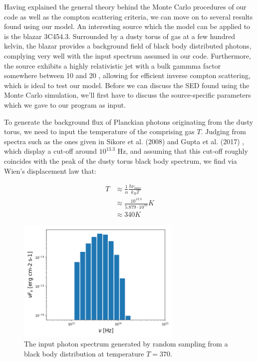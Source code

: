 \documentclass{article}
\begin{document}
    Having explained the general theory behind the Monte Carlo procedures of our code as well as the compton scattering criteria, we can move on to several results found using our model. An interesting source which the model can be applied to is the blazar 3C454.3. Surrounded by a dusty torus of gas at a few hundred kelvin, the blazar provides a background field of black body distributed photons, complying very well with the input spectrum assumed in our code. Furthermore, the source exhibits a highly relativistic jet with a bulk gammma factor somewhere between 10 and 20 \cite{Hovatta2009,Gupta2017}, allowing for efficient inverse compton scattering, which is ideal to test our model. Before we can discuss the SED found using the Monte Carlo simulation, we'll first have to discuss the source-specific parameters which we gave to our program as input. \\

    \par To generate the background flux of Planckian photons originating from the dusty torus, we need to input the temperature of the comprising gas $T$. Judging from spectra such as the ones given in Sikore et al. (2008) \cite{Sikora2008} and Gupta et al. (2017) \cite{Gupta2017}, which display a cut-off around $10^{13.3}$ Hz, and assuming that this cut-off roughly coincides with the peak of the dusty torus black body spectrum, we find via Wien's displacement law that:

        \begin{align*}
            T &\approx \frac{1}{\alpha} \frac{h \nu_{max}}{k_B T} \\
              &\approx \frac{10^{13.3}}{5.879\cdot 10^{10}} K \\
              &\approx 340 K
        \end{align*}

    \begin{figure}[p]
        \centering
        \includegraphics[width=0.7\textwidth]{3C454_3_inputSED.png}
        \caption{The input photon spectrum generated by random sampling from a black body distribution at temperature $T=370$.} 
    \end{figure} 
    \label{fig:inputSED}
\end{document}
